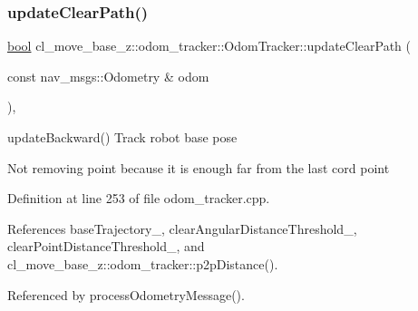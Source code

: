 \subsubsection{\texorpdfstring{update\+Clear\+Path()}{updateClearPath()}}
{\footnotesize\ttfamily \hyperlink{classbool}{bool} cl\+\_\+move\+\_\+base\+\_\+z\+::odom\+\_\+tracker\+::\+Odom\+Tracker\+::update\+Clear\+Path (\begin{DoxyParamCaption}\item[{const nav\+\_\+msgs\+::\+Odometry \&}]{odom }\end{DoxyParamCaption})\hspace{0.3cm}{\ttfamily [protected]}, {\ttfamily [virtual]}}

update\+Backward() Track robot base pose

Not removing point because it is enough far from the last cord point 

Definition at line 253 of file odom\+\_\+tracker.\+cpp.



References base\+Trajectory\+\_\+, clear\+Angular\+Distance\+Threshold\+\_\+, clear\+Point\+Distance\+Threshold\+\_\+, and cl\+\_\+move\+\_\+base\+\_\+z\+::odom\+\_\+tracker\+::p2p\+Distance().



Referenced by process\+Odometry\+Message().



